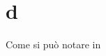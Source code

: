 \documentclass[a4paper,12pt,final, openany, titlepage, twoside]{book}
\begin{document}
	
	
	\frontmatter
	
	
	
	\mainmatter
	
	\section{d}
	\lipsum[1-10] Come si può notare in \cite{bimber2005spatial}
	\backmatter
	
	
\end{document}
